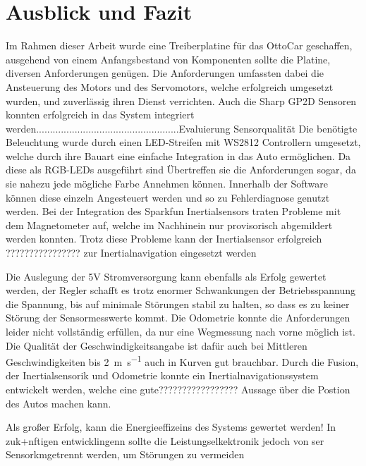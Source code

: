 \chapter{Ausblick und Fazit}

Im Rahmen dieser Arbeit wurde eine Treiberplatine für das OttoCar geschaffen, ausgehend von einem Anfangsbestand von Komponenten sollte die Platine, diversen Anforderungen genügen.
Die Anforderungen umfassten dabei die Ansteuerung des Motors und des Servomotors, welche erfolgreich umgesetzt wurden, und zuverlässig ihren Dienst verrichten.
Auch die Sharp GP2D Sensoren konnten erfolgreich in das System integriert werden....................................................Evaluierung Sensorqualität
Die benötigte Beleuchtung wurde durch einen LED-Streifen mit WS2812 Controllern umgesetzt, welche durch ihre Bauart eine einfache Integration in das Auto ermöglichen.
Da diese als RGB-LEDs ausgeführt sind Übertreffen sie die Anforderungen sogar, da sie nahezu jede mögliche Farbe Annehmen können. Innerhalb der Software können diese einzeln Angesteuert
werden und so zu Fehlerdiagnose genutzt werden. Bei der Integration des Sparkfun Inertialsensors traten Probleme mit dem Magnetometer auf, welche im Nachhinein nur provisorisch abgemildert werden konnten.
Trotz diese Probleme kann der Inertialsensor erfolgreich ???????????????? zur Inertialnavigation eingesetzt werden %

Die Auslegung der 5V Stromversorgung kann ebenfalls als Erfolg gewertet werden, der Regler schafft es trotz enormer Schwankungen der Betriebsspannung die Spannung, bis auf minimale Störungen
stabil zu halten, so dass es zu keiner Störung der Sensormesswerte kommt. Die Odometrie konnte die Anforderungen leider nicht vollständig erfüllen, da nur eine Wegmessung nach vorne möglich ist.
Die Qualität der Geschwindigkeitsangabe ist dafür auch bei Mittleren Geschwindigkeiten bis \SI{2}{\metre\per\second} auch in Kurven gut brauchbar. Durch die Fusion, der
Inertialsensorik und Odometrie konnte ein Inertialnavigationssystem
entwickelt werden, welche eine gute????????????????? Aussage über die Postion des Autos machen kann.

Als großer Erfolg, kann die Energieeffizeins des Systems gewertet werden! 
In zuk+nftigen entwicklingenn sollte die Leistungselkektronik jedoch von ser Sensorkmgetrennt werden, um Störungen zu vermeiden

